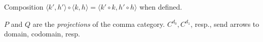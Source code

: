 \noindent Composition $\langle k',h' \rangle \circ \langle k,h \rangle = \langle k' \circ k, h' \circ h \rangle$ when defined.

\begin{figure}[H]
\centering

\end{figure}

\noindent $P$ and $Q$ are the \emph{projections} of the comma category. $C^{d_0},C^{d_1}$, resp., send arrows to domain, codomain, resp.

\begin{figure}[H]
\centering

\end{figure}